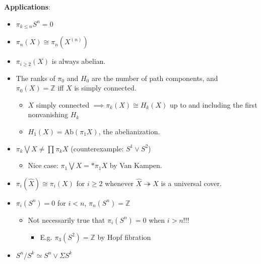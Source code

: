 \textbf{Applications}:

\begin{itemize}
\tightlist
\item
  \(\pi_{k\leq n}S^n = 0\)
\item
  \(\pi_n(X) \cong \pi_n(X^{(n)})\)
\end{itemize}

\begin{theorem}


\end{theorem}

\begin{itemize}
\item
  \(\pi_{i\geq 2}(X)\) is always abelian.
\item
  The ranks of \(\pi_0\) and \(H_0\) are the number of path components,
  and \(\pi_0(X) = {\mathbb{Z}}\) iff \(X\) is simply connected.

  \begin{itemize}
  \tightlist
  \item
    \(X\) simply connected \(\implies \pi_k(X) \cong H_k(X)\) up to and
    including the first nonvanishing \(H_k\)
  \item
    \(H_1(X) = \mathrm{Ab}(\pi_1 X)\), the abelianization.
  \end{itemize}
\item
  \(\pi_k \bigvee X \neq \prod \pi_k X\) (counterexample:
  \(S^1 \vee S^2\))

  \begin{itemize}
  \tightlist
  \item
    Nice case: \(\pi_1\bigvee X = \ast \pi_1 X\) by Van Kampen.
  \end{itemize}
\item
  \(\pi_i(\widehat{X}) \cong \pi_i(X)\) for \(i\geq 2\) whenever
  \(\widehat{X} \twoheadrightarrow X\) is a universal cover.
\item
  \(\pi_i(S^n) = 0\) for \(i < n\), \(\pi_n(S^n) = {\mathbb{Z}}\)

  \begin{itemize}
  \tightlist
  \item
    Not necessarily true that \(\pi_i(S^n) = 0\) when \(i > n\)!!!

    \begin{itemize}
    \tightlist
    \item
      E.g. \(\pi_3(S^2) = {\mathbb{Z}}\) by Hopf fibration
    \end{itemize}
  \end{itemize}
\item
  \(S^n / S^k \simeq S^n \vee \Sigma S^{k}\)


\end{itemize}

